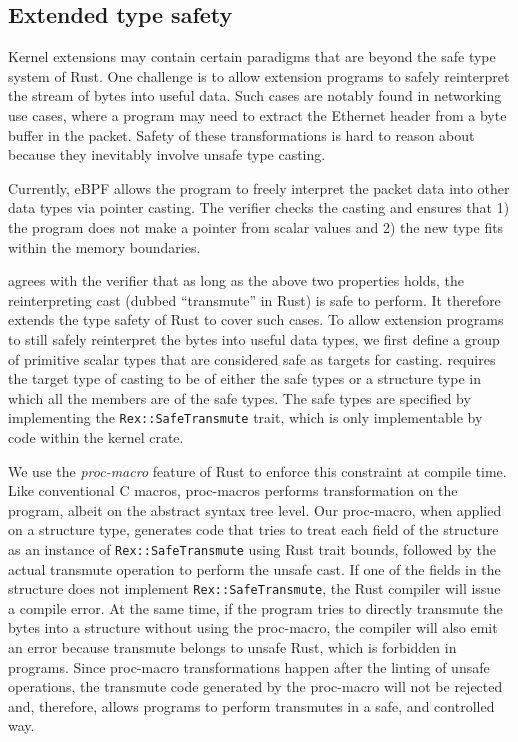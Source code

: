 \subsection{Extended type safety}
Kernel extensions may contain certain paradigms that are beyond the safe
    type system of Rust.
One challenge is to allow extension programs to safely reinterpret the stream
    of bytes into useful data.
Such cases are notably found in networking use cases, where a program may need
    to extract the Ethernet header from a byte buffer in the packet.
Safety of these transformations is hard to reason about because they
    inevitably involve unsafe type casting.

Currently, eBPF allows the program to freely interpret the packet data into
    other data types via pointer casting.
The verifier checks the casting and ensures that 1) the program does not make a
    pointer from scalar values and 2) the new type fits within the memory
    boundaries.

\projname{} agrees with the verifier that as long as the above two properties
    holds, the reinterpreting cast (dubbed ``transmute'' in Rust) is safe to
    perform.
It therefore extends the type safety of Rust to cover such cases.
To allow extension programs to still safely reinterpret the bytes into useful
    data types, we first define a group of primitive scalar types that are
    considered safe as targets for casting.
\projname{} requires the target type of casting to be of either the safe types
    or a structure type in which all the members are of the safe types.
The safe types are specified by implementing the \texttt{Rex::SafeTransmute}
    trait, which is only implementable by code within the kernel crate.

We use the \emph{proc-macro} feature of Rust to enforce this constraint at
    compile time.
Like conventional C macros, proc-macros performs transformation on the program,
    albeit on the abstract syntax tree level.
Our proc-macro, when applied on a structure type, generates code that tries
    to treat each field of the structure as an instance of
    \texttt{Rex::SafeTransmute} using Rust trait bounds, followed by the actual
    transmute operation to perform the unsafe cast.
If one of the fields in the structure does not implement
    \texttt{Rex::SafeTransmute}, the Rust compiler will issue a compile error.
At the same time, if the program tries to directly transmute the bytes into a
    structure without using the proc-macro, the compiler will also emit an
    error because transmute belongs to unsafe Rust, which is forbidden in
    \projname{} programs.
Since proc-macro transformations happen after the linting of unsafe operations,
    the transmute code generated by the proc-macro will not be rejected and,
    therefore, allows programs to perform transmutes in a safe, and controlled
    way.

